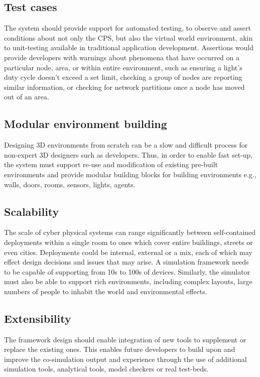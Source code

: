 \subsection{Test cases}
\label{sub:requirements_test_cases} 
The system should provide support for automated testing, to observe and assert conditions about not only the CPS, but also the virtual world environment, akin to unit-testing available in traditional application development. Assertions would provide developers with warnings about phenomena that have occurred on a particular node, area, or within entire environment, such as ensuring a light's duty cycle doesn't exceed a set limit, checking a group of nodes are reporting similar information, or checking for network partitions once a node has moved out of an area.


\subsection{Modular environment building}
\label{sub:requirements_modular_building}
Designing 3D environments from scratch can be a slow and difficult process for non-expert 3D designers such as developers. Thus, in order to enable fast set-up, the system must support re-use and modification of existing pre-built environments and provide modular building blocks for building environments e.g., walls, doors, rooms, sensors, lights, agents.


\subsection{Scalability} %
\label{sub:requirements_scalability}
The scale of cyber physical systems can range significantly between self-contained deployments within a single room to ones which cover entire buildings, streets or even cities. Deployments could be internal, external or a mix, each of which may effect design decisions and issues that may arise. A simulation framework needs to be capable of supporting from 10s to 100s of devices. Similarly, the simulator must also be able to support rich environments, including complex layouts, large numbers of people to inhabit the world and environmental effects.



\subsection{Extensibility} %
\label{sub:requirements_extensibility}
The framework design should enable integration of new tools to supplement or replace the existing ones. This enables future developers to build upon and improve the co-simulation output and experience through the use of additional simulation tools, analytical tools, model checkers or real test-beds.


